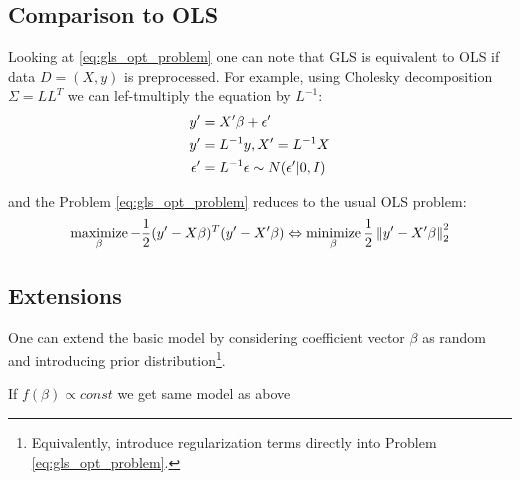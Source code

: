 \subsection{Comparison to OLS}
Looking at \autoref{eq:gls_opt_problem} one can note that GLS is equivalent to OLS if data $D=(X, y)$ is preprocessed. For example, using Cholesky decomposition $\Sigma = L L^T  $ we can lef-tmultiply the equation by $L^{-1}$:
\begin{align}
	y' &= X' \beta + \epsilon' \\
	y' &= L^{-1} y, X' = L^{-1} X \notag \\
	\epsilon' &= L^{-1} \epsilon \sim N(\epsilon' | 0, I) \notag
\end{align}

and the Problem \ref{eq:gls_opt_problem} reduces to the usual OLS problem: 
\begin{align}
	\label{eq:gls_opt_problem}
	\operatorname*{maximize}_{\beta} -\frac{1}{2} (y' - X\beta)^T  (y' - X' \beta)  \Leftrightarrow \operatorname*{minimize}_{\beta} \frac{1}{2} \left\| y' - X' \beta \right\|_2^2
\end{align}

\subsection{Extensions}
One can extend the basic model by considering coefficient vector $\beta$ as random and introducing prior distribution\footnote{Equivalently, introduce regularization terms directly into Problem \ref{eq:gls_opt_problem}.}.

If $f(\beta) \propto const$ we get same model as above





